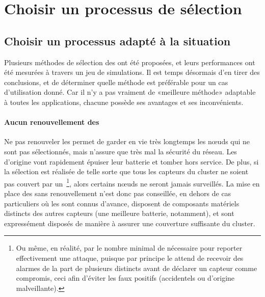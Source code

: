 \section{Choisir un processus de sélection}

    \subsection{Choisir un processus adapté à la situation}
Plusieurs méthodes de sélection des \cns ont été proposées, et leurs performances ont été mesurées à travers un jeu de simulations.
Il est temps désormais d'en tirer des conclusions, et de déterminer quelle méthode est préférable pour un cas d'utilisation donné.
Car il n'y a pas vraiment de «meilleure méthode» adaptable à toutes les applications, chacune possède ses avantages et ses inconvénients.

\paragraph{Aucun renouvellement des \cns}
Ne pas renouveler les \cns permet de garder en vie très longtemps les nœuds qui ne sont pas sélectionnés, mais n'assure que très mal la sécurité du réseau.
Les \cns d'origine vont rapidement épuiser leur batterie et tomber hors service.
De plus, si la sélection est réalisée de telle sorte que tous les capteurs du cluster ne soient pas couvert par un \cn\,\footnote{Ou même, en réalité, par le nombre minimal de \cns nécessaire pour reporter effectivement une attaque, puisque par principe le \ch attend de recevoir des alarmes de la part de plusieurs \cns distincts avant de déclarer un capteur comme compromis, ceci afin d'éviter les faux positifs (accidentels ou d'origine malveillante).}, alors certains nœuds ne seront jamais surveillés.
La mise en place des \cns sans renouvellement n'est donc pas conseillée, en dehors de cas particuliers où les \cns sont connus d'avance, disposent de composants matériels distincts des autres capteurs (une meilleure batterie, notamment), et sont expressément disposés de manière à assurer une couverture suffisante du cluster.

